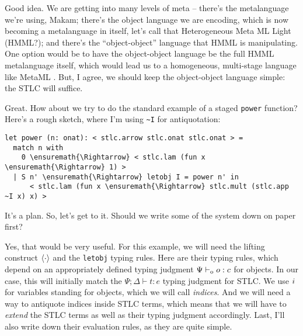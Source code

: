 \heroADVISOR{} Good idea. We are getting into many levels of meta -- there's
the metalanguage we're using, Makam; there's the object language we are
encoding, which is now becoming a metalanguage in itself, let's call
that Heterogeneous Meta ML Light (HMML?); and there's the
``object-object'' language that HMML is manipulating. One option would
be to have the object-object language be the full HMML metalanguage
itself, which would lead us to a homogeneous, multi-stage language like
MetaML \citep{metaml-main-reference}. But, I agree, we should keep the
object-object language simple: the STLC will suffice.

\heroSTUDENT{} Great. How about we try to do the standard example of a staged
\texttt{power} function? Here's a rough sketch, where I'm using
\texttt{\textasciitilde{}I} for antiquotation:

\begin{verbatim}
let power (n: onat): < stlc.arrow stlc.onat stlc.onat > =
  match n with
    0 \ensuremath{\Rightarrow} < stlc.lam (fun x \ensuremath{\Rightarrow} 1) >
  | S n' \ensuremath{\Rightarrow} letobj I = power n' in
      < stlc.lam (fun x \ensuremath{\Rightarrow} stlc.mult (stlc.app ~I x) x) >
\end{verbatim}

\heroADVISOR{} It's a plan. So, let's get to it. Should we write some of the
system down on paper first?

\heroSTUDENT{} Yes, that would be very useful. For this example, we will need
the lifting construct \(\langle\cdot\rangle\) and the \texttt{letobj} typing
rules. Here are their typing rules, which depend on an appropriately
defined typing judgment \(\Psi \vdash_{\text{o}} o : c\) for objects. In our case,
this will initially match the \(\Psi; \Delta \vdash t : e\) typing
judgment for STLC. We use \(i\) for variables standing for
objects, which we will call \emph{indices}. And we will need a way to
antiquote indices inside STLC terms, which means that we will have to
\emph{extend} the STLC terms as well as their typing judgment
accordingly. Last, I'll also write down their evaluation rules, as they
are quite simple.

\newcommand\stlce[0]{\hat{e}}
\newcommand\stlct[0]{\hat{t}}
\newcommand\stlc[1]{\hat{#1}}

